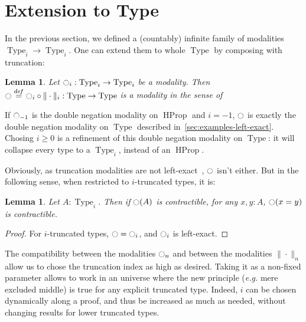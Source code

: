 \documentclass[preprint,9pt,numbers]{sigplanconf}
\newtheorem{lem}[thm]{Lemma}
\newcommand \defeq {\overset{de\hspace{-0.2ex}f}{=}}
\newcommand{\mynote}[2]{
    \fbox{\bfseries\sffamily\scriptsize#1}
    {\small$\blacktriangleright$\textsf{\emph{#2}}$\blacktriangleleft$}~}
\newcommand\nt[1]{\mynote{NT}{#1}}
\DeclareMathOperator{\Type}{Type}
\DeclareMathOperator{\HProp}{HProp}
\newcommand{\modal}{\ensuremath{\ocircle}}
\begin{document}

\section{Extension to Type}
\label{sec:extension-type}

In the previous section, we defined a (countably) infinite family of
modalities $\Type_i \to \Type_i$. One can extend them to whole
$\Type$ by composing with truncation:

\begin{lem}\label{lem:type}
  Let $\modal_i:\Type_i \to \Type_i$ be a modality. Then $\modal
  \defeq \modal_i
  \circ \|\cdot\|_i : \Type \to \Type$ is a modality in the sense
  of~\cite[Section 7.7]{hottbook}
\end{lem}

If $\modal_{-1}$ is the double negation modality on $\HProp$ and
$i=-1$, $\modal$ is exactly the double negation modality on $\Type$
described in~\ref{sec:examples-left-exact}.
Chosing $i\geqslant 0$ is a refinement of this double negation
modality on $\Type$: it will collapse every type to a $\Type_i$,
instead of an $\HProp$.

Obviously, as truncation modalities are not left-exact~\cite[Exercise
7.11]{hottbook}, $\modal$ isn't either. But in the following sense, when
restricted to $i$-truncated types, it is:
\begin{lem}
  Let $A:\Type_i$. Then if $\modal(A)$ is contractible, for any $x,y:A$,
  $\modal(x=y)$ is contractible.
\end{lem}
\begin{proof}
  For $i$-truncated types, $\modal = \modal_i$, and $\modal_i$ is left-exact.
\end{proof}

The compatibility between the modalities $\modal_n$ and between the
modalities $\|\cdot \|_n$ allow us to chose the truncation index as
high as desired.
Taking it as a non-fixed parameter allows to work in an
universe where the new principle ({\em e.g.} mere excluded middle) is
true for any explicit truncated type. Indeed, $i$ can be chosen
dynamically along a proof, and thus be increased as much as needed,
without changing results for lower truncated types.
\end{document}
